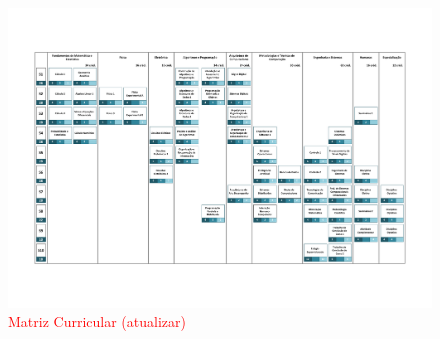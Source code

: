 \begin{landscape}
    \begin{figure}[H]
        \centering
        \caption{\textcolor{red}{Matriz Curricular (atualizar)}}
        \label{fig:matriz_completa}
        \includegraphics[scale=.9]{imagens/Grade_eixos}
    \end{figure}

    \singlespacing



\end{landscape}
